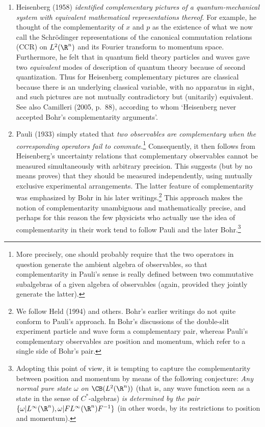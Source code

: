 \documentclass[12pt,titlepage]{article}
\newcommand{\ca}{$C^*$-algebra} \newcommand{\jba}{JB-algebra}
\newcommand{\inv}{^{-1}} \newcommand{\sa}{_{\R}}
\newcommand{\om}{\omega} \newcommand{\Om}{\Omega}
\begin{document}
\begin{enumerate}
\item Heisenberg (1958) {\it  identified complementary pictures  of
a quantum-mechanical system with equivalent mathematical representations thereof}. For example, he thought of the complementarity of $x$ and $p$ as the
existence of what we now call the Schr\"{o}dinger representations of the canonical commutation relations (CCR) 
on $L^2(\R^n)$ and its Fourier transform to momentum space. 
Furthermore, he felt that in quantum field theory particles and waves gave two {\it equivalent} modes of description of quantum theory because of second quantization. 
Thus for Heisenberg complementary pictures are classical because there is an underlying classical variable, with no apparatus in sight, and such pictures are not mutually contradictory   but (unitarily) equivalent. See also Camilleri (2005, p.\ 88), according to whom `Heisenberg never accepted Bohr's complementarity arguments'. 
\item \label{item2list} Pauli (1933) simply stated that {\it two observables are complementary when the corresponding operators fail to commute}.\footnote{ More precisely, one should probably require that the two operators in question generate the ambient algebra of observables, so that complementarity in Pauli's sense is really defined between two commutative subalgebras
of a given algebra of observables (again, provided they jointly generate the latter).}
Consequently, it then follows from Heisenberg's uncertainty relations that complementary observables cannot be measured simultaneously with arbitrary precision. This suggests (but by no means proves) that they should be measured independently, using mutually exclusive experimental arrangements. The latter feature of complementarity was emphasized by Bohr in his later writings.\footnote{We follow Held (1994) and others. Bohr's  earlier writings do not quite conform to Pauli's approach. In  Bohr's discussions of the double-slit experiment particle and wave form a complementary pair, whereas Pauli's complementary observables are position and momentum, which refer to a single side of Bohr's  pair.} This approach makes the notion 
of  complementarity  unambiguous and mathematically precise, and perhaps for this reason
the few physicists who actually use the idea of complementarity in their work tend to follow Pauli and the later Bohr.\footnote{Adopting this point of view, it is tempting to capture the complementarity between position and momentum by means of the following conjecture: \textit{Any normal pure state $\om$ on $\CB(L^2(\R^n))$} (that is, any wave function seen as a state in the sense of \ca s) {\it is determined by the pair $\{\om| L^{\infty}(\R^n), \om| FL^{\infty}(\R^n)F\inv\}$} (in other words, by its restrictions to position and momentum).
}
\end{enumerate}
\end{document}
